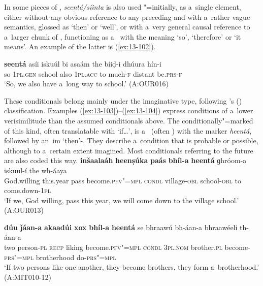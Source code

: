 In some pieces of , \textit{seentá/síinta} is also used "=initially, as a~single element, either without any obvious reference to any preceding  and with a~rather vague semantics, glossed as `then' or `well', or with a~very general causal reference to a~larger chunk of , functioning as a~ with the meaning `so', `therefore' or `it means'. An example of the latter is (\ref{ex:13-102}).

\begin{exe}
\ex
\label{ex:13-102}
\gll \textbf{seentá} asíi iskuúl bi asaám the bíiḍ-i dhúura  hín-i \\
so \textsc{1pl.gen} school also \textsc{1pl.acc} to much-\textsc{f} distant be.\textsc{prs-f} \\
\glt `So, we also have a~long way to school.' (A:OUR016) 
\end{exe}

 These conditionals belong mainly under the imaginative type, following \citeauthor{thompsonetal2007}'s (\citeyear[259--260]{thompsonetal2007}) classification. Examples (\ref{ex:13-103})--(\ref{ex:13-104}) express conditions of a~lower verisimilitude than the assumed conditionals above. The conditionally"=marked  of this kind, often translatable with `if{\ldots}', is a~ (often )  with the  marker \textit{heentá}, followed by an~im `then'-. They describe a~condition that is probable or possible, although to a~certain extent imagined. Most conditionals referring to the future are also coded this way.
\ea
\label{ex:13-103}
\gll \textbf{inšaalaáh} \textbf{heenṣúka} \textbf{paás} \textbf{bhíl-a} \textbf{heentá} ɡhróom-a iskuul-í the wh-áaya\\
God.willing this.year pass become.\textsc{pfv"=mpl} \textsc{condl} village-\textsc{obl} school-\textsc{obl} to come.down-\textsc{1pl}\\
\glt `If we, God willing, pass this year, we will come down to the village school.' (A:OUR013)

\ex
\label{ex:13-104}
\gll \textbf{dúu} \textbf{ǰáan-a} \textbf{akaadúi} \textbf{xox} \textbf{bhíl-a} \textbf{heentá} se bhraawú bh-áan-a bhraawéeli th-áan-a\\
two person-\textsc{pl} \textsc{recp} liking become.\textsc{pfv"=mpl} \textsc{condl} \textsc{3pl.nom} brother.\textsc{pl} become-\textsc{prs"=mpl} brotherhood do-\textsc{prs"=mpl} \\
\glt `If two persons like one another, they become brothers, they form a~brotherhood.' (A:MIT010-12) 
\z

